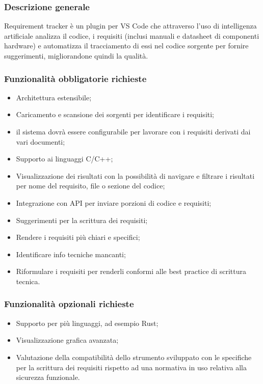 \documentclass[10pt]{article}
\begin{document}
\subsubsection{Descrizione generale}
Requirement tracker è un plugin per VS Code che attraverso l’uso di intelligenza artificiale analizza il codice, i requisiti (inclusi manuali e datasheet di componenti hardware) e automatizza il tracciamento di essi nel codice sorgente per fornire suggerimenti, migliorandone quindi la qualità.
\subsubsection{Funzionalità obbligatorie richieste}
\begin{itemize}
    \item Architettura estensibile;
    \item Caricamento e scansione dei sorgenti per identificare i requisiti;
    \item il sistema dovrà essere configurabile per lavorare con i requisiti derivati dai vari documenti;
    \item Supporto ai linguaggi C/C++;
    \item Visualizzazione dei risultati con la possibilità di navigare e filtrare i risultati per nome del requisito, file o sezione del codice;
    \item Integrazione con API per inviare porzioni di codice e requisiti;
    \item Suggerimenti per la scrittura dei requisiti;
    \item Rendere i requisiti più chiari e specifici;
    \item Identificare info tecniche mancanti;
    \item Riformulare i requisiti per renderli conformi alle best practice di scrittura tecnica.
\end{itemize}
\subsubsection{Funzionalità opzionali richieste}
\begin{itemize}
    \item Supporto per più linguaggi, ad esempio Rust;
    \item Visualizzazione grafica avanzata;
    \item Valutazione della compatibilità dello strumento sviluppato con le specifiche per la scrittura dei requisiti rispetto ad una normativa in uso relativa alla sicurezza funzionale.
\end{itemize}
\end{document}
